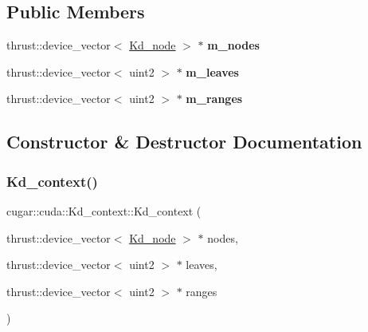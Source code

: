 \subsection*{Public Members}
\begin{DoxyCompactItemize}
\item 
\mbox{\label{structcugar_1_1cuda_1_1_kd__context_a194733e014257d08edc4f7c7b7b5b232}} 
thrust\+::device\+\_\+vector$<$ \hyperlink{structcugar_1_1_kd__node}{Kd\+\_\+node} $>$ $\ast$ {\bfseries m\+\_\+nodes}
\item 
\mbox{\label{structcugar_1_1cuda_1_1_kd__context_a3b02e2269ab2bff209644490614748f8}} 
thrust\+::device\+\_\+vector$<$ uint2 $>$ $\ast$ {\bfseries m\+\_\+leaves}
\item 
\mbox{\label{structcugar_1_1cuda_1_1_kd__context_aabd47af2effa3080fe02cdc4688150df}} 
thrust\+::device\+\_\+vector$<$ uint2 $>$ $\ast$ {\bfseries m\+\_\+ranges}
\end{DoxyCompactItemize}


\subsection{Constructor \& Destructor Documentation}
\mbox{\label{structcugar_1_1cuda_1_1_kd__context_a654bb141ef5aee074a05d56cfcac3ca1}} 
\subsubsection{\texorpdfstring{Kd\+\_\+context()}{Kd\_context()}}
{\footnotesize\ttfamily cugar\+::cuda\+::\+Kd\+\_\+context\+::\+Kd\+\_\+context (\begin{DoxyParamCaption}\item[{thrust\+::device\+\_\+vector$<$ \hyperlink{structcugar_1_1_kd__node}{Kd\+\_\+node} $>$ $\ast$}]{nodes,  }\item[{thrust\+::device\+\_\+vector$<$ uint2 $>$ $\ast$}]{leaves,  }\item[{thrust\+::device\+\_\+vector$<$ uint2 $>$ $\ast$}]{ranges }\end{DoxyParamCaption})\hspace{0.3cm}{\ttfamily [inline]}}

